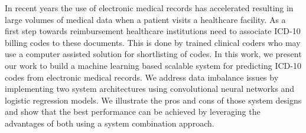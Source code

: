 In recent years the use of electronic medical records has accelerated resulting in large volumes of medical data when a patient visits a healthcare facility. As a first step towards reimbursement healthcare institutions need to associate ICD-10 billing codes to these documents. This is done by trained clinical coders who may use a computer assisted solution for shortlisting of codes. In this work, we present our work to build a machine learning based scalable system for predicting ICD-10 codes from electronic medical records. We address data imbalance issues by implementing two system architectures using convolutional neural networks and logistic regression models.  We illustrate the pros and cons of those system designs and show that the best performance can be achieved by leveraging the advantages of both using a system combination approach.
